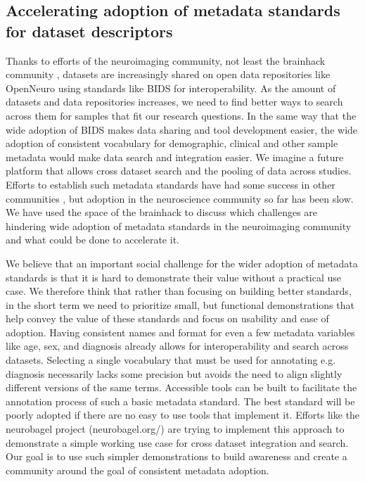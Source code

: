 \documentclass[../main.tex]{subfiles}
\begin{document}
\subsection{Accelerating adoption of metadata standards for dataset descriptors}

%

Thanks to efforts of the neuroimaging community, not least the brainhack community \parencite{Gau2021}, datasets are increasingly shared on open data repositories like OpenNeuro \parencite{Markiewicz2021-bf} using standards like BIDS \parencite{Gorgolewski2016-bp} for interoperability. As the amount of datasets and data repositories increases, we need to find better ways to search across them for samples that fit our research questions. In the same way that the wide adoption of BIDS makes data sharing and tool development easier, the wide adoption of consistent vocabulary for demographic, clinical and other sample metadata would make data search and integration easier. We imagine a future platform that allows cross dataset search and the pooling of data across studies. Efforts to establish such metadata standards have had some success in other communities \parencite{Field2008-kw, Stang2010-nl}, but adoption in the neuroscience community so far has been slow. We have used the space of the brainhack to discuss which challenges are hindering wide adoption of metadata standards in the neuroimaging community and what could be done to accelerate it.

We believe that an important social challenge for the wider adoption of metadata standards is that it is hard to demonstrate their value without a practical use case. We therefore think that rather than focusing on building better standards, in the short term we need to prioritize small, but functional demonstrations that help convey the value of these standards and focus on usability and ease of adoption. Having consistent names and format for even a few metadata variables like age, sex, and diagnosis already allows for interoperability and search across datasets. Selecting a single vocabulary that must be used for annotating e.g. diagnosis necessarily lacks some precision but avoids the need to align slightly different versions of the same terms. Accessible tools can be built to facilitate the annotation process of such a basic metadata standard. The best standard will be poorly adopted if there are no easy to use tools that implement it. Efforts like the neurobagel project (neurobagel.org/) are trying to implement this approach to demonstrate a simple working use case for cross dataset integration and search. Our goal is to use such simpler demonstrations to build awareness and create a community around the goal of consistent metadata adoption.
\end{document}
